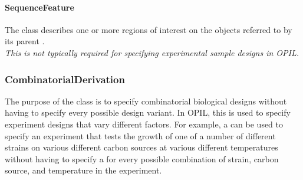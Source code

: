 \paragraph{SequenceFeature}
\label{sec:sbol:SequenceFeature}

The  class describes one or more regions of interest on the  objects referred to by its parent . 
\\{\em This is not typically required for specifying experimental sample designs in OPIL.}

\subsubsection{CombinatorialDerivation}
\label{sec:sbol:CombinatorialDerivation}

The purpose of the  class is to specify combinatorial biological designs without having to specify every possible design variant. 
In OPIL, this is used to specify experiment designs that vary different factors.
For example, a  can be used to specify an experiment that tests the growth of one of a number of  different strains on various different carbon sources at various different temperatures without having to specify a  for every possible combination of strain, carbon source, and temperature in the experiment.

